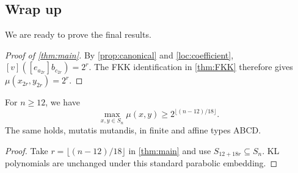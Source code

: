 \documentclass[a4paper,11pt]{amsart}
\newcommand{\tpar}{v}
\numberwithin{equation}{subsection}
\theoremstyle{plain}
\theoremstyle{definition}
\theoremstyle{remark}
\newcommand{\remarkend}{\null\hfill$\Diamond$}
\begin{document}
\subsection{Wrap up}\label{S:Wrap}

We are ready to prove the final results.

\begin{proof}[Proof of \autoref{thm:main}]
By \autoref{prop:canonical} and \autoref{loc:coefficient},
$[\tpar]([e_{a_{2r}}]b_{c_{2r}})=2^r$. The FKK identification in
\autoref{thm:FKK} therefore gives $\mu(x_{2r},y_{2r})=2^r$.
\end{proof}

\begin{corollary}\label{thm:rankbound}
For $n\ge12$, we have
\[
\max_{x,y\in S_n}\mu(x,y)\ge2^{\lfloor(n-12)/18\rfloor}.
\]
The same holds, mutatis mutandis, in finite and affine types ABCD.
\end{corollary}

\begin{proof}
Take $r=\lfloor(n-12)/18\rfloor$ in \autoref{thm:main} and use
$S_{12+18r}\subseteq S_n$. KL polynomials are unchanged under this
standard parabolic embedding.
\end{proof}

\begingroup
\renewcommand{\remarkend}{}
\end{document}
